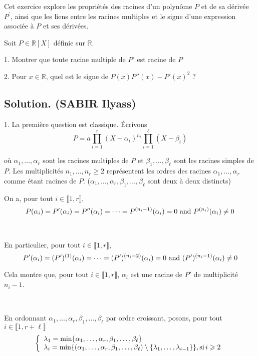 Cet exercice explore les propri{\'e}t{\'e}s des racines d'un polyn{\^o}me $P$ et de sa d{\'e}riv{\'e}e $P^{\prime}$, ainsi que les liens entre les racines multiples et le signe d'une expression associ{\'e}e {\`a} $P$ et ses d{\'e}riv{\'e}es.
\begin{exercise}[(Oral de l'X 2016)]
Soit $P \in \mathbb{R}[X]$ d{\'e}finie sur $\mathbb{R}$.

1. Montrer que toute racine multiple de $P'$ est racine de $P$

2. Pour $x \in \mathbb{R}$, quel est le signe de $P (x) P'' (x) - P' (x)^2$ ?
\end{exercise}

\subsection*{Solution. (SABIR Ilyass)}

1. La premi{\`e}re question est classique. {\'E}crivons
\[ P = a \prod_{i = 1}^r (X - \alpha_i)^{n_i}  \prod_{i = 1}^{\ell} (X -
   \beta_i) \]


o{\`u} $\alpha_1, \ldots, \alpha_r$ sont les racines multiples de $P$ et
$\beta_1, \ldots, \beta_{\ell}$ sont les racines simples de $P$. Les
multiplicit{\'e}s $n_1, \ldots, n_r \geq 2$ repr{\'e}sentent les ordres des
racines $\alpha_1, \ldots, \alpha_r$ comme {\'e}tant racines de $P$.
($\alpha_1, \ldots, \alpha_r, \beta_1, \ldots, \beta_{\ell}$ sont deux {\`a}
deux distincts)

On a, pour tout $i \in \llbracket 1, r \rrbracket$,
\[ P (\alpha_i) = P' (\alpha_i) = P'' (\alpha_i) = \cdots = P^{(n_i - 1)}
   (\alpha_i) = 0 \text{ and } P^{(n_i)} (\alpha_i) \neq 0 \]


\

En particulier, pour tout $i \in \llbracket 1, r \rrbracket$,
\[ P' (\alpha_i) = (P')^{(1)} (\alpha_i) = \cdots = (P')^{(n_i - 2)}
   (\alpha_i) = 0 \text{ and } (P')^{(n_i - 1)} (\alpha_i) \neq 0 \]


Cela montre que, pour tout $i \in \llbracket 1, r \rrbracket$, $\alpha_i$ est
une racine de $P'$ de multiplicit{\'e} $n_i - 1$.

\

En ordonnant $\alpha_1, \ldots, \alpha_r, \beta_1, \ldots, \beta_{\ell}$ par
ordre croissant, posons, pour tout $i \in \llbracket 1, r + \ell \rrbracket$
\[ \left\{\begin{array}{l}
     \lambda_1 = \min \{\alpha_1, \ldots, \alpha_r, \beta_1, \ldots,
     \beta_{\ell} \}\\
     \lambda_i = \min \{(\alpha_1, \ldots, \alpha_r, \beta_1, \ldots,
     \beta_{\ell}) \setminus \{\lambda_1, \ldots, \lambda_{i - 1} \}\},
     \operatorname{si} i \geqslant 2
   \end{array}\right. \]
\[ \  \]


